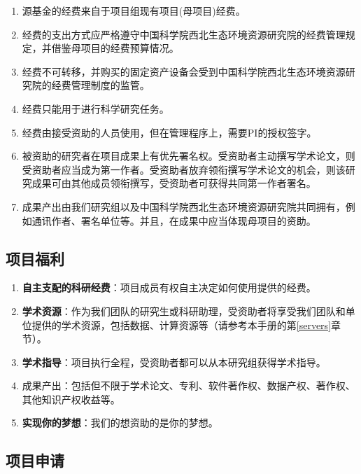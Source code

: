 \documentclass[
]{ctexbook}
\providecommand{\tightlist}{%
  \setlength{\itemsep}{0pt}\setlength{\parskip}{0pt}}
\begin{document}
\begin{enumerate}
\def\labelenumi{\arabic{enumi}.}
\tightlist
\item
  源基金的经费来自于项目组现有项目(母项目)经费。
\item
  经费的支出方式应严格遵守中国科学院西北生态环境资源研究院的经费管理规定，并借鉴母项目的经费预算情况。
\item
  经费不可转移，并购买的固定资产设备会受到中国科学院西北生态环境资源研究院的经费管理制度的监管。
\item
  经费只能用于进行科学研究任务。
\item
  经费由接受资助的人员使用，但在管理程序上，需要PI的授权签字。
\item
  被资助的研究者在项目成果上有优先署名权。受资助者主动撰写学术论文，则受资助者应当成为第一作者。受资助者放弃领衔撰写学术论文的机会，则该研究成果可由其他成员领衔撰写，受资助者可获得共同第一作者署名。
\item
  成果产出由我们研究组以及中国科学院西北生态环境资源研究院共同拥有，例如通讯作者、署名单位等。并且，在成果中应当体现母项目的资助。
\end{enumerate}

\hypertarget{ux9879ux76eeux798fux5229}{%
\subsection{项目福利}\label{ux9879ux76eeux798fux5229}}

\begin{enumerate}
\def\labelenumi{\arabic{enumi}.}
\tightlist
\item
  \textbf{自主支配的科研经费}：项目成员有权自主决定如何使用提供的经费。
\item
  \textbf{学术资源}：作为我们团队的研究生或科研助理，受资助者将享受我们团队和单位提供的学术资源，包括数据、计算资源等（请参考本手册的第\ref{servers}章节）。
\item
  \textbf{学术指导}：项目执行全程，受资助者都可以从本研究组获得学术指导。
\item
  成果产出：包括但不限于学术论文、专利、软件著作权、数据产权、著作权、其他知识产权收益等。
\item
  \textbf{实现你的梦想}：我们的想资助的是你的梦想。
\end{enumerate}

\hypertarget{ux9879ux76eeux7533ux8bf7}{%
\subsection{项目申请}\label{ux9879ux76eeux7533ux8bf7}}
\end{document}
